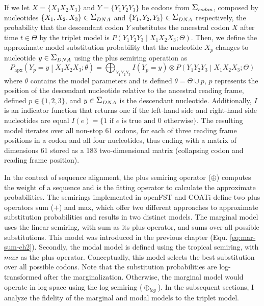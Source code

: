 If we let $X= \{X_1 X_2 X_3\}$ and $Y = \{Y_1 Y_2 Y_3\}$ be codons from $\grande{\Sigma}_{codon}$, composed by nucleotides $\{X_1,X_2,X_3\} \in \grande{\Sigma}_{DNA}$ and $\{Y_1,Y_2,Y_3\} \in \grande{\Sigma}_{DNA}$ respectively, the probability that the descendant codon $Y$ substitutes the ancestral codon $X$ after time $t \in \Theta$ by the triplet model is $P\left(Y_1 Y_2 Y_3 \middle| X_1 X_2 X_3; \Theta \right)$. Then, we define the approximate model substitution probability that the nucleotide $X_p$ changes to nucleotide $y \in \grande{\Sigma}_{DNA}$ using the plus semiring operation as
%
\begin{equation} \label{eq:marginal-tmp}
P_\text{apx}\left(Y_p = y \middle| X_1 X_2 X_3;\theta \right) =
\bigoplus_{Y_1 Y_2 Y_3} I(Y_p = y) \otimes P\left(Y_1 Y_2 Y_3 \middle| X_1 X_2 X_3;\Theta \right)
\end{equation}
%
where $\theta$ contains the model parameters and is defined $\theta = \Theta \cup p$, $p$ represents the position of the descendant nucleotide relative to the ancestral reading frame, defined $p \in \{1, 2, 3\}$, and $y \in \grande{\Sigma}_{DNA}$ is the descendant nucleotide. Additionally, $I$ is an indicator function that returns one if the left-hand side and right-hand side nucleotides are equal
%
$I(e) = \{ 1 \text{ if $e$ is true and } 0 \text{ otherwise}\}$.
%
The resulting model iterates over all non-stop 61 codons, for each of three reading frame positions in a codon and all four nucleotides, thus ending with a matrix of dimensions 61 stored as a 183 two-dimensional matrix (collapsing codon and reading frame position).

In the context of sequence alignment, the plus semiring operator ($\oplus$) computes the weight of a sequence and is the fitting operator to calculate the approximate probabilities. The semirings implemented in openFST and COATi define two plus operators sum ($+$) and max, which offer two different approaches to approximate substitution probabilities and results in two distinct models. The marginal model uses the linear semiring, with sum as its plus operator, and sums over all possible substitutions. This model was introduced in the previous chapter (Equ. \ref{eq:mar-sum-ch2}). Secondly, the modal model is defined using the tropical semiring, with $max$ as the plus operator. Conceptually, this model selects the best substitution over all possible codons. Note that the substitution probabilities are log-transformed after the marginalization. Otherwise, the marginal model would operate in log space using the log semiring ($\oplus_{log}$). In the subsequent sections, I analyze the fidelity of the marginal and modal models to the triplet model.

